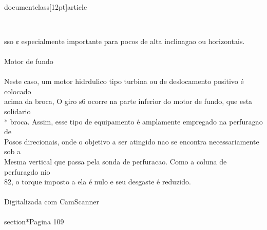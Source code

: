 \\documentclass[12pt]{article}
\begin{document}
\\{sso ¢ especialmente importante para pocos de alta inclinagao ou horizontais.\\
\\
Motor de fundo\\
\\
Neste caso, um motor hidrdulico tipo turbina ou de deslocamento positivo é colocado\\
acima da broca, O giro s6 ocorre na parte inferior do motor de fundo, que esta solidario\\
* broca. Assim, esse tipo de equipamento é amplamente empregado na perfuragao de\\
Posos direcionais, onde o objetivo a ser atingido nao se encontra necessariamente sob a\\
Mesma vertical que passa pela sonda de perfuracao. Como a coluna de perfuragdo nio\\
82, o torque imposto a ela é nulo e seu desgaste é reduzido.\\
\\
Digitalizada com CamScanner\\

\\section*{Pagina 109}

}
\end{document}
